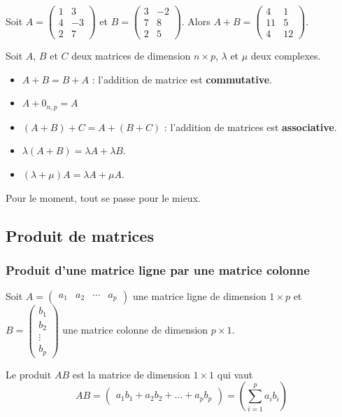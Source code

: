 \documentclass[11pt,fleqn]{book} %
\begin{document}
\begin{example}Soit $A= \begin{pmatrix} 1 & 3 \\ 4 & -3 \\ 2 & 7 \end{pmatrix}$ et $B=\begin{pmatrix}3  & -2 \\ 7 & 8 \\ 2 & 5\end{pmatrix}$. Alors $A+B = \begin{pmatrix} 4 & 1 \\ 11 & 5 \\ 4 & 12 \end{pmatrix}$.\end{example}

\begin{proposition}Soit $A$, $B$ et $C$ deux matrices de dimension $n \times p$, $\lambda$ et $\mu$ deux complexes.
\begin{itemize}
\item $A+B =B+A$ : l'addition de matrice est\textbf{ commutative}.
\item $A + 0_{n,p}=A$
\item $(A+B)+C = A + (B+C)$ : l'addition de matrices est \textbf{associative}.
\item $\lambda(A+B)=\lambda A+\lambda B$.
\item $(\lambda + \mu) A = \lambda A + \mu A$.
\end{itemize}\end{proposition}

Pour le moment, tout se passe pour le mieux.

\subsection{Produit de matrices}

\subsubsection{Produit d'une matrice ligne par une matrice colonne}

\begin{definition}Soit $A = \begin{pmatrix}a_1 & a_2 & \cdots & a_p \end{pmatrix}$ une matrice ligne de dimension $1 \times p$ et $B= \begin{pmatrix} b_1 \\ b_2 \\ \vdots \\ b_p\end{pmatrix}$ une matrice colonne de dimension $p \times 1$.

Le produit $AB$ est la matrice de dimension $1 \times 1$ qui vaut
\[AB = \begin{pmatrix}
a_1b_1+a_2b_2+\dots + a_pb_p
\end{pmatrix} = \left( \sum_{i=1}^p a_ib_i \right)\]\end{definition}
\end{document}
